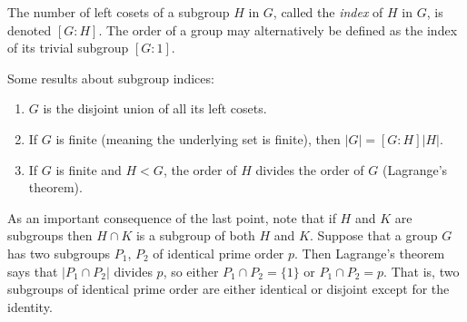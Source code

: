 \begin{defn}
The number of left cosets of a subgroup $H$ in $G$, called the \emph{index} of
$H$ in $G$, is denoted $[G:H]$. The order of a group may alternatively
be defined as the index of its trivial subgroup $[G : 1]$.
\end{defn}

\begin{corol}
Some results about subgroup indices:
\begin{enumerate}
  \item{$G$ is the disjoint union of all its left cosets.}
  \item{If $G$ is finite (meaning the underlying set is finite), then
        $|G| = [G:H] |H|$.}
  \item{If $G$ is finite and $H < G$, the order of $H$ divides the
        order of $G$ (Lagrange's theorem).}
\end{enumerate}
\end{corol}

As an important consequence of the last point, note that if $H$ and
$K$ are subgroups then $H \cap K$ is a subgroup of both $H$ and
$K$. Suppose that a group $G$ has two subgroups
$P_1$, $P_2$ of identical prime order $p$. Then Lagrange's theorem says that
$|P_1 \cap P_2|$ divides $p$, so either
$P_1 \cap P_2 = \{ 1 \}$ or $P_1 \cap P_2 = p$. That is, two
subgroups of identical prime order are either identical or disjoint
except for the identity.

